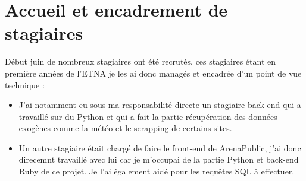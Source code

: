 \section{Accueil et encadrement de stagiaires}
Début juin de nombreux stagiaires ont été recrutés, ces stagiaires étant en première années de l'ETNA je les ai donc managés et encadrée d'un point de vue technique :
\begin{itemize}
	\item[\textbullet] J'ai notamment eu sous ma responsabilité directe un stagiaire back-end qui a travaillé sur du Python et qui a fait la partie récupération des données exogènes comme la météo et le scrapping de certains sites. 
	\item[\textbullet] Un autre stagiaire était chargé de faire le front-end de ArenaPublic, j'ai donc direcemnt travaillé avec lui car je m'occupai de la partie Python et back-end Ruby de ce projet. Je l'ai également aidé pour les requêtes SQL à effectuer.
\end{itemize}

  


